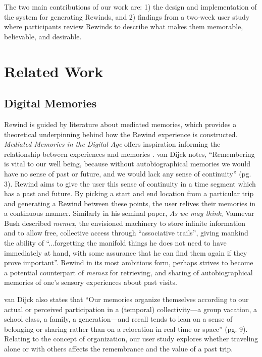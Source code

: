 \documentclass{sigchi}
\begin{document}
The two main contributions of our work are: 1) the design and implementation of the system for generating Rewinds, and 2) findings from a two-week user study where participants review Rewinds to describe what makes them memorable, believable, and desirable.

\section{Related Work}
\subsection{Digital Memories}
Rewind is guided by literature about mediated memories, which provides a theoretical underpinning behind how the Rewind experience is constructed. \textit{Mediated Memories in the Digital Age} offers inspiration informing the relationship between experiences and memories \cite{van2007mediated}. van Dijck notes, ``Remembering is vital to our well being, because without autobiographical memories we would have no sense of past or future, and we would lack any sense of continuity'' (pg. 3). Rewind aims to give the user this sense of continuity in a time segment which has a past and future. By picking a start and end location from a particular trip and generating a Rewind between these points, the user relives their memories in a continuous manner. Similarly in his seminal paper, \textit{As we may think}, Vannevar Bush described \textit{memex}, the envisioned machinery to store infinite information and to allow free, collective access through ``associative trails'', giving mankind the ability of ``...forgetting the manifold things he does not need to have immediately at hand, with some assurance that he can find them again if they prove important''. Rewind in its most ambitious form, perhaps strives to become a potential counterpart of \textit{memex} for retrieving, and sharing of autobiographical memories of one's sensory experiences about past visits.

van Dijck also states that ``Our memories organize themselves according to our actual or perceived participation in a (temporal) collectivity---a group vacation, a school class, a family, a generation---and recall tends to lean on a sense of belonging or sharing rather than on a relocation in real time or space'' (pg. 9). Relating to the concept of organization, our user study explores whether traveling alone or with others affects the remembrance and the value of a past trip. 
\end{document}
